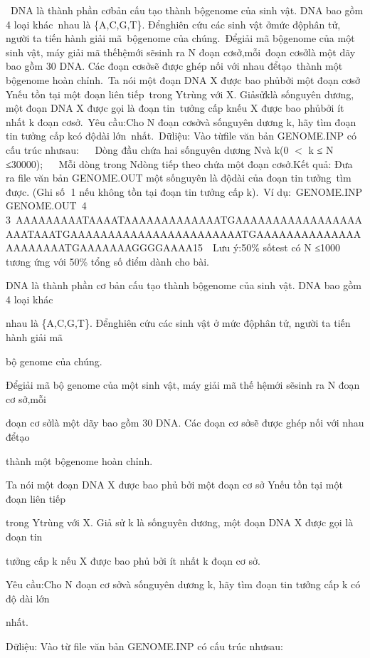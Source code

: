 

 DNA là thành phần cơbản cấu tạo thành bộgenome của sinh vật. DNA bao gồm 4 loại khác nhau là \{A,C,G,T\}. Đểnghiên cứu các sinh vật ởmức độphân tử, người ta tiến hành giải mã bộgenome của chúng. Đểgiải mã bộgenome của một sinh vật, máy giải mã thếhệmới sẽsinh ra N đoạn cơsở,mỗi đoạn cơsởlà một dãy bao gồm 30 DNA. Các đoạn cơsởsẽ được ghép nối với nhau đểtạo thành một bộgenome hoàn chỉnh. Ta nói một đoạn DNA X được bao phủbởi một đoạn cơsở Ynếu tồn tại một đoạn liên tiếp trong Ytrùng với X. Giảsửklà sốnguyên dương, một đoạn DNA X được gọi là đoạn tin tưởng cấp knếu X được bao phủbởi ít nhất k đoạn cơsở. Yêu cầu:Cho N đoạn cơsởvà sốnguyên dương k, hãy tìm đoạn tin tưởng cấp kcó độdài lớn nhất. Dữliệu: Vào từfile văn bản GENOME.INP có cấu trúc nhưsau:   Dòng đầu chứa hai sốnguyên dương Nvà k(0 $<$ k ≤ N ≤30000);   Mỗi dòng trong Ndòng tiếp theo chứa một đoạn cơsở.Kết quả: Đưa ra file văn bản GENOME.OUT một sốnguyên là độdài của đoạn tin tưởng tìm được. (Ghi số 1 nếu không tồn tại đoạn tin tưởng cấp k). Ví dụ: GENOME.INP GENOME.OUT 4 3 AAAAAAAAATAAAATAAAAAAAAAAAAATGAAAAAAAAAAAAAAAAAAAATAAATGAAAAAAAAAAAAAAAAAAAAAAATGAAAAAAAAAAAAAAAAAAAAAATGAAAAAAAGGGGAAAA15  Lưu ý:50\% sốtest có N ≤1000 tương ứng với 50\% tổng số điểm dành cho bài.

DNA là thành phần cơ bản cấu tạo thành bộgenome của sinh vật. DNA bao gồm 4 loại khác 

nhau là \{A,C,G,T\}. Đểnghiên cứu các sinh vật ở mức độphân tử, người ta tiến hành giải mã 

bộ genome của chúng. 

Đểgiải mã bộ genome của một sinh vật, máy giải mã thế hệmới sẽsinh ra N đoạn cơ sở,mỗi 

đoạn cơ sởlà một dãy bao gồm 30 DNA. Các đoạn cơ sởsẽ được ghép nối với nhau đểtạo 

thành một bộgenome hoàn chỉnh. 

Ta nói một đoạn DNA X được bao phủ bởi một đoạn cơ sở Ynếu tồn tại một đoạn liên tiếp 

trong Ytrùng với X. Giả sử k là sốnguyên dương, một đoạn DNA X được gọi là đoạn tin 

tưởng cấp k nếu X được bao phủ bởi ít nhất k đoạn cơ sở. 

Yêu cầu:Cho N đoạn cơ sởvà sốnguyên dương k, hãy tìm đoạn tin tưởng cấp k có độ dài lớn 

nhất. 

Dữliệu: Vào từ file văn bản GENOME.INP có cấu trúc nhưsau: 

